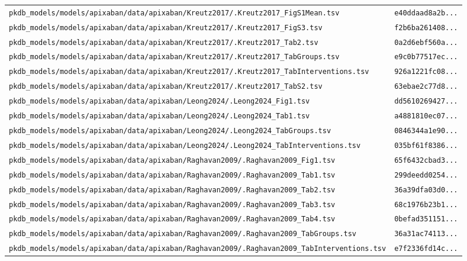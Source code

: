 \documentclass{article}
\begin{document}
\begin{longtable}{ll}
\texttt{pkdb\_models/models/apixaban/data/apixaban/Kreutz2017/.Kreutz2017\_FigS1Mean.tsv} & \texttt{e40ddaad8a2b...} \\
\texttt{pkdb\_models/models/apixaban/data/apixaban/Kreutz2017/.Kreutz2017\_FigS3.tsv} & \texttt{f2b6ba261408...} \\
\texttt{pkdb\_models/models/apixaban/data/apixaban/Kreutz2017/.Kreutz2017\_Tab2.tsv} & \texttt{0a2d6ebf560a...} \\
\texttt{pkdb\_models/models/apixaban/data/apixaban/Kreutz2017/.Kreutz2017\_TabGroups.tsv} & \texttt{e9c0b77517ec...} \\
\texttt{pkdb\_models/models/apixaban/data/apixaban/Kreutz2017/.Kreutz2017\_TabInterventions.tsv} & \texttt{926a1221fc08...} \\
\texttt{pkdb\_models/models/apixaban/data/apixaban/Kreutz2017/.Kreutz2017\_TabS2.tsv} & \texttt{63ebae2c77d8...} \\
\texttt{pkdb\_models/models/apixaban/data/apixaban/Leong2024/.Leong2024\_Fig1.tsv} & \texttt{dd5610269427...} \\
\texttt{pkdb\_models/models/apixaban/data/apixaban/Leong2024/.Leong2024\_Tab1.tsv} & \texttt{a4881810ec07...} \\
\texttt{pkdb\_models/models/apixaban/data/apixaban/Leong2024/.Leong2024\_TabGroups.tsv} & \texttt{0846344a1e90...} \\
\texttt{pkdb\_models/models/apixaban/data/apixaban/Leong2024/.Leong2024\_TabInterventions.tsv} & \texttt{035bf61f8386...} \\
\texttt{pkdb\_models/models/apixaban/data/apixaban/Raghavan2009/.Raghavan2009\_Fig1.tsv} & \texttt{65f6432cbad3...} \\
\texttt{pkdb\_models/models/apixaban/data/apixaban/Raghavan2009/.Raghavan2009\_Tab1.tsv} & \texttt{299deedd0254...} \\
\texttt{pkdb\_models/models/apixaban/data/apixaban/Raghavan2009/.Raghavan2009\_Tab2.tsv} & \texttt{36a39dfa03d0...} \\
\texttt{pkdb\_models/models/apixaban/data/apixaban/Raghavan2009/.Raghavan2009\_Tab3.tsv} & \texttt{68c1976b23b1...} \\
\texttt{pkdb\_models/models/apixaban/data/apixaban/Raghavan2009/.Raghavan2009\_Tab4.tsv} & \texttt{0befad351151...} \\
\texttt{pkdb\_models/models/apixaban/data/apixaban/Raghavan2009/.Raghavan2009\_TabGroups.tsv} & \texttt{36a31ac74113...} \\
\texttt{pkdb\_models/models/apixaban/data/apixaban/Raghavan2009/.Raghavan2009\_TabInterventions.tsv} & \texttt{e7f2336fd14c...} \\

\end{longtable}
\end{document}
